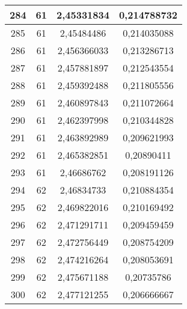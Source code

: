 {\begin{minipage}[!h]{0.45\textwidth}
\begin{longtable}{cccc}
284 & 61 & 2,45331834 & 0,214788732 \\ \hline
285 & 61 & 2,45484486 & 0,214035088 \\ \hline
286 & 61 & 2,456366033 & 0,213286713 \\ \hline
287 & 61 & 2,457881897 & 0,212543554 \\ \hline
288 & 61 & 2,459392488 & 0,211805556 \\ \hline
289 & 61 & 2,460897843 & 0,211072664 \\ \hline
290 & 61 & 2,462397998 & 0,210344828 \\ \hline
291 & 61 & 2,463892989 & 0,209621993 \\ \hline
292 & 61 & 2,465382851 & 0,20890411 \\ \hline
293 & 61 & 2,46686762 & 0,208191126 \\ \hline
294 & 62 & 2,46834733 & 0,210884354 \\ \hline
295 & 62 & 2,469822016 & 0,210169492 \\ \hline
296 & 62 & 2,471291711 & 0,209459459 \\ \hline
297 & 62 & 2,472756449 & 0,208754209 \\ \hline
298 & 62 & 2,474216264 & 0,208053691 \\ \hline
299 & 62 & 2,475671188 & 0,20735786 \\ \hline
300 & 62 & 2,477121255 & 0,206666667 \\ \hline
\end{longtable}
\end{minipage}

}

